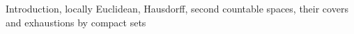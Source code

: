 Introduction, locally Euclidean, Hausdorff, second countable spaces, their covers and exhaustions by compact sets